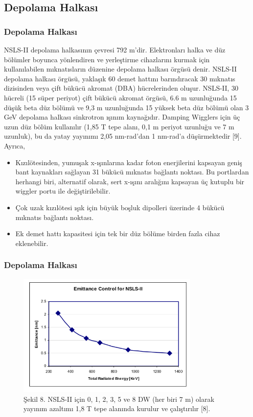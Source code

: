 \documentclass[aspectratio=169,10pt]{beamer}
\begin{document}
	\subsection{Depolama Halkası}
\begin{frame}[allowframebreaks]

\frametitle{Depolama Halkası}

	
NSLS-II depolama halkasının çevresi 792 m'dir. Elektronları halka ve düz bölümler boyunca yönlendiren ve yerleştirme cihazlarını kurmak için kullanılabilen mıknatısların düzenine depolama halkası örgüsü denir. NSLS-II depolama halkası örgüsü, yaklaşık 60 demet hattını barındıracak 30 mıknatıs dizisinden veya çift bükücü akromat (DBA) hücrelerinden oluşur. NSLS-II, 30 hücreli (15 süper periyot) çift bükücü akromat örgüsü, 6.6 m uzunluğunda 15 düşük beta düz bölümü ve 9,3 m uzunluğunda 15 yüksek beta düz bölümü olan 3 GeV depolama halkası sinkrotron ışınım kaynağıdır. Damping Wigglers için üç uzun düz bölüm kullanılır (1,85 T tepe alanı, 0,1 m periyot uzunluğu ve 7 m uzunluk), bu da yatay yayınımı 2,05 nm-rad'dan 1 nm-rad'a düşürmektedir [9]. Ayrıca,

\begin{itemize}
    \item Kızılötesinden, yumuşak x-ışınlarına kadar foton enerjilerini kapsayan geniş bant kaynakları sağlayan 31 bükücü mıknatıs bağlantı noktası. Bu portlardan herhangi biri, alternatif olarak, sert x-ışını aralığını kapsayan üç kutuplu bir wiggler portu ile değiştirilebilir.
    
    \item Çok uzak kızılötesi ışık için büyük boşluk dipolleri üzerinde 4 bükücü mıknatıs bağlantı noktası.
    
    \item Ek demet hattı kapasitesi için tek bir düz bölüme birden fazla cihaz eklenebilir.
\end{itemize}

\end{frame}

\begin{frame}[allowframebreaks]
\frametitle{Depolama Halkası}

	\begin{figure}[h]
 \centering
\includegraphics[width=9cm]{emittence.png}
\caption*{
\centering
Şekil 8. NSLS-II için 0, 1, 2, 3, 5 ve 8 DW (her biri 7 m) olarak yayınım azaltımı 1,8 T tepe alanında kurulur ve çalıştırılır [8].}
	\end{figure}

\end{frame}
\end{document}
